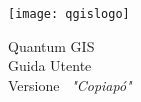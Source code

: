 
\begin{titlepage}
\begin{center}

\begin{center}
\texttt{[image: qgislogo]} 
\end{center}

\Huge{Quantum GIS}\\
\vspace{0.5cm}
\Large{Guida Utente} \\
\vspace{0.5cm}
\Large{Versione ~\CURRENT \textsl{"Copiapó"}}

\end{center}
\end{titlepage}
